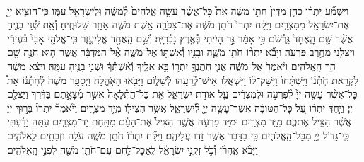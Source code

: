 \documentclass[twoside, openany, parskip=half, 11pt]{book}
\begin{document}
\begin{footnotesize}
\begin{multicols}{2}
\\
וַיִּשְׁמַ֞ע יִתְר֨וֹ כֹהֵ֤ן מִדְיָן֙ חֹתֵ֣ן מֹשֶׁ֔ה אֵת֩ כׇּל־אֲשֶׁ֨ר עָשָׂ֤ה אֱלֹהִים֙ לְ֯מֹשֶׁ֔ה וּֽלְיִשְׂרָאֵ֖ל עַמּ֑וֹ כִּֽי־הוֹצִ֧יא יְיָ֛ אֶת־יִשְׂרָאֵ֖ל מִמִּצְרָֽיִם׃ וַיִּקַּ֗ח יִתְרוֹ֙ חֹתֵ֣ן מֹשֶׁ֔ה אֶת־צִפֹּרָ֖ה אֵ֣שֶׁת מֹשֶׁ֑ה אַחַ֖ר שִׁלּוּחֶֽיהָ׃ וְ֯אֵ֖ת שְׁ֯נֵ֣י בָנֶ֑יהָ אֲשֶׁ֨ר שֵׁ֤ם הָֽאֶחָד֙ גֵּֽרְ֯שֹׁ֔ם כִּ֣י אָמַ֔ר גֵּ֣ר הָיִ֔יתִי בְּ֯אֶ֖רֶץ נָכְ֯רִיָּֽה׃ וְ֯שֵׁ֥ם הָֽאֶחָ֖ד אֱלִיעֶ֑זֶר כִּֽי־אֱלֹהֵ֤י אָבִי֙ בְּ֯עֶזְרִ֔י וַיַּצִּלֵ֖נִי מֵחֶ֥רֶב פַּרְעֹֽה׃  וַיָּבֹ֞א יִתְר֨וֹ חֹתֵ֥ן מֹשֶׁ֛ה וּבָנָ֥יו וְ֯אִשְׁתּ֖וֹ אֶל־מֹשֶׁ֑ה אֶ֨ל־הַמִּדְבָּ֔ר אֲשֶׁר־ה֛וּא חֹנֶ֥ה שָׁ֖ם הַ֥ר הָֽאֱלֹהִֽים׃ וַיֹּ֨אמֶר֙ אֶל־מֹשֶׁ֔ה אֲנִ֛י חֹֽתֶנְךָ֥ יִתְר֖וֹ בָּ֣א אֵלֶ֑יךָ וְ֯אִ֨שְׁתְּ֯ךָ֔ וּשְׁנֵ֥י בָנֶ֖יהָ עִמָּֽהּ׃ וַיֵּצֵ֨א מֹשֶׁ֜ה לִקְרַ֣את חֹֽתְ֯נ֗וֹ וַיִּשְׁתַּ֨חוּ֙ וַיִּשַּׁק־ל֔וֹ וַיִּשְׁאֲל֥וּ אִישׁ־לְ֯רֵעֵ֖הוּ לְ֯שָׁל֑וֹם וַיָּבֹ֖אוּ הָאֹֽהֱלָה׃ וַיְסַפֵּ֤ר מֹשֶׁה֙ לְ֯חֹ֣תְ֯נ֔וֹ אֵת֩ כׇּל־אֲשֶׁ֨ר עָשָׂ֤ה יְיָ֙ לְ֯פַרְעֹ֣ה וּלְמִצְרַ֔יִם עַ֖ל אוֹדֹ֣ת יִשְׂרָאֵ֑ל אֵ֤ת כׇּל־הַתְּ֯לָאָה֙ אֲשֶׁ֣ר מְ֯צָאָ֣תַם בַּדֶּ֔רֶךְ וַיַּצִּלֵ֖ם יְיָ׃  וַיִּ֣חַדְּ יִתְר֔וֹ עַ֚ל כׇּל־הַטּוֹבָ֔ה אֲשֶׁר־עָשָׂ֥ה יְיָ֖ לְ֯יִשְׂרָאֵ֑ל אֲשֶׁ֥ר הִצִּיל֖וֹ מִיַּ֥ד מִצְרָֽיִם׃ וַיֹּ֘אמֶר֘ יִתְרוֹ֒ בָּר֣וּךְ יְיָ֔ אֲשֶׁ֨ר הִצִּ֥יל אֶתְכֶ֛ם מִיַּ֥ד מִצְרַ֖יִם וּמִיַּ֣ד פַּרְעֹ֑ה אֲשֶׁ֤ר הִצִּיל֙ אֶת־הָעָ֔ם מִתַּ֖חַת יַד־מִצְרָֽיִם׃ עַתָּ֣ה יָדַ֔עְתִּי כִּֽי־גָד֥וֹל יְיָ֖ מִכׇּל־הָֽאֱלֹהִ֑ים כִּ֣י בַדָּבָ֔ר אֲשֶׁ֥ר זָד֖וּ עֲלֵיהֶֽם׃ וַיִּקַּ֞ח יִתְר֨וֹ חֹתֵ֥ן מֹשֶׁ֛ה עֹלָ֥ה וּזְבָחִ֖ים לֵֽאלֹהִ֑ים וַיָּבֹ֨א אַֽהֲרֹ֜ן וְ֯כֹ֣ל זִקְנֵ֣י יִשְׂרָאֵ֗ל לֶֽאֱכׇל־לֶ֛חֶם עִם־חֹתֵ֥ן מֹשֶׁ֖ה לִפְנֵ֥י הָֽאֱלֹהִֽים׃


\end{multicols}
\end{footnotesize}
\end{document}
